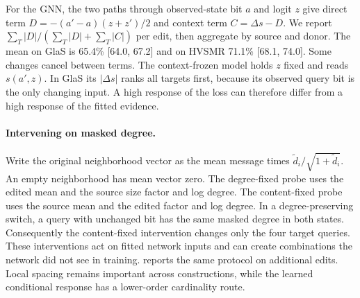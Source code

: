 For the GNN, the two paths through observed-state bit $a$ and logit $z$ give direct term $D=-(a'-a)(z+z')/2$ and context term $C=\Delta s-D$. We report $\sum_T|D|/(\sum_T|D|+\sum_T|C|)$ per edit, then aggregate by source and donor. The mean on GlaS is 65.4\% [64.0, 67.2] and on HVSMR 71.1\% [68.1, 74.0]. Some changes cancel between terms. The context-frozen model holds $z$ fixed and reads $s(a',z)$. In GlaS its $|\Delta s|$ ranks all targets first, because its observed query bit is the only changing input. A high response of the loss can therefore differ from a high response of the fitted evidence.

\begin{table}[t]
\centering
\caption{Matched switch sensitivity, direction, and collateral. $T$ denotes the four targets and $U$ untouched pairs. AUROCs, moved fractions and directional wins are percentages. $W_+$ and $W_-$ summarize additions and removals. The last five columns use training IQR units and report signed mean target shift and absolute shift percentiles. Each percentile is first taken within an edit. The matched scope has 78 fields from 12 gland donors and 59 scans from 59 cardiac donors. Full paired intervals and raw pair scores are retained in the reproducibility data.}
\label{tab:shifts}
\scriptsize
\setlength{\tabcolsep}{2.8pt}

\end{table}

\paragraph{Intervening on masked degree.}
Write the original neighborhood vector as the mean message times $\tilde d_i/\sqrt{1+\tilde d_i}$. An empty neighborhood has mean vector zero. The degree-fixed probe uses the edited mean and the source size factor and log degree. The content-fixed probe uses the source mean and the edited factor and log degree. In a degree-preserving switch, a query with unchanged bit has the same masked degree in both states. Consequently the content-fixed intervention changes only the four target queries. These interventions act on fitted network inputs and can create combinations the network did not see in training.  reports the same protocol on additional edits. Local spacing remains important across constructions, while the learned conditional response has a lower-order cardinality route.

\begin{table}[t]
\centering
\caption{Degree intervention on the fitted GNN. Response ranks absolute changes in probability. Paired 95\% intervals are shown. Repeated edits reuse the original donors.}
\label{tab:degree}
\scriptsize

\end{table}

